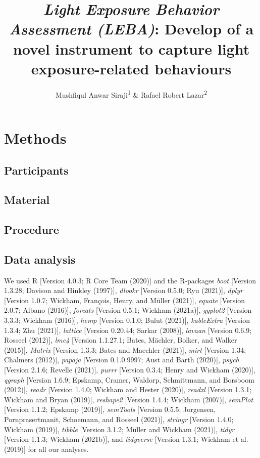 \documentclass[
  english,
  man]{apa6}
\title{\emph{Light Exposure Behavior Assessment (LEBA)}: Develop of a novel instrument to capture light exposure-related behaviours}
\author{Mushfiqul Anwar Siraji\textsuperscript{1} \& Rafael Robert Lazar\textsuperscript{2}}
\date{}
\affiliation{\vspace{0.5cm}\textsuperscript{1} Wilhelm-Wundt-University\\\textsuperscript{2} Konstanz Business School}
\begin{document}
\maketitle

\hypertarget{methods}{%
\section{Methods}\label{methods}}

\hypertarget{participants}{%
\subsection{Participants}\label{participants}}

\hypertarget{material}{%
\subsection{Material}\label{material}}

\hypertarget{procedure}{%
\subsection{Procedure}\label{procedure}}

\hypertarget{data-analysis}{%
\subsection{Data analysis}\label{data-analysis}}

We used R {[}Version 4.0.3; R Core Team (2020){]} and the R-packages \emph{boot} {[}Version 1.3.28; Davison and Hinkley (1997){]}, \emph{dlookr} {[}Version 0.5.0; Ryu (2021){]}, \emph{dplyr} {[}Version 1.0.7; Wickham, François, Henry, and Müller (2021){]}, \emph{equate} {[}Version 2.0.7; Albano (2016){]}, \emph{forcats} {[}Version 0.5.1; Wickham (2021a){]}, \emph{ggplot2} {[}Version 3.3.3; Wickham (2016){]}, \emph{hemp} {[}Version 0.1.0; Bulut (2021){]}, \emph{kableExtra} {[}Version 1.3.4; Zhu (2021){]}, \emph{lattice} {[}Version 0.20.44; Sarkar (2008){]}, \emph{lavaan} {[}Version 0.6.9; Rosseel (2012){]}, \emph{lme4} {[}Version 1.1.27.1; Bates, Mächler, Bolker, and Walker (2015){]}, \emph{Matrix} {[}Version 1.3.3; Bates and Maechler (2021){]}, \emph{mirt} {[}Version 1.34; Chalmers (2012){]}, \emph{papaja} {[}Version 0.1.0.9997; Aust and Barth (2020){]}, \emph{psych} {[}Version 2.1.6; Revelle (2021){]}, \emph{purrr} {[}Version 0.3.4; Henry and Wickham (2020){]}, \emph{qgraph} {[}Version 1.6.9; Epskamp, Cramer, Waldorp, Schmittmann, and Borsboom (2012){]}, \emph{readr} {[}Version 1.4.0; Wickham and Hester (2020){]}, \emph{readxl} {[}Version 1.3.1; Wickham and Bryan (2019){]}, \emph{reshape2} {[}Version 1.4.4; Wickham (2007){]}, \emph{semPlot} {[}Version 1.1.2; Epskamp (2019){]}, \emph{semTools} {[}Version 0.5.5; Jorgensen, Pornprasertmanit, Schoemann, and Rosseel (2021){]}, \emph{stringr} {[}Version 1.4.0; Wickham (2019){]}, \emph{tibble} {[}Version 3.1.2; Müller and Wickham (2021){]}, \emph{tidyr} {[}Version 1.1.3; Wickham (2021b){]}, and \emph{tidyverse} {[}Version 1.3.1; Wickham et al. (2019){]} for all our analyses.
\end{document}
